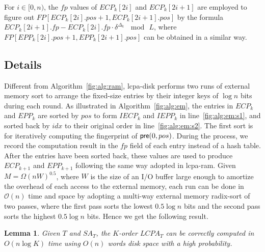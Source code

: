 \documentclass[10pt,journal,compsoc]{IEEEtran}
\newtheorem{Lemma}{Lemma}
\begin{document}
\begin{CJK*}{GBK}{song}
For $i\in [0,n)$, the $fp$ values of $ECP_k[2i]$ and $ECP_k[2i+1]$ are employed to figure out $FP[ECP_k[2i].pos+1, ECP_k[2i+1].pos]$ by the formula $ECP_k[2i+1].fp - ECP_k[2i].fp \cdot \delta^{\Delta_k} \, \mod \, L$, where $FP[EPP_k[2i].pos+1, EPP_k[2i+1].pos]$ can be obtained in a similar way.

\subsection{Details}
Different from Algorithm~\ref{fig:alg:ram}, lcpa-disk performs two runs of external memory sort to arrange the fixed-size entries by their integer keys of $\log n$ bits during each round. As illustrated in Algorithm~\ref{fig:alg:em}, the entries in $ECP_k$ and $EPP_k$ are sorted by $pos$ to form $IECP_k$ and $IEPP_k$ in line~\ref{fig:alg:em:s1}, and sorted back by $idx$ to their original order in line~\ref{fig:alg:em:s2}. The first sort is for iteratively computing the fingerprint of ${\sf pre}(0,pos)$. During the process, we record the computation result in the $fp$ field of each entry instead of a hash table. After the entries have been sorted back, these values are used to produce $ECP_{k+1}$ and $EPP_{k+1}$ following the same way adopted in lcpa-ram. Given $M=\Omega(nW)^{0.5}$, where $W$ is the size of an I/O buffer large enough to amortize the overhead of each access to the external memory, each run can be done in $\mathcal{O}(n)$ time and space by adopting a multi-way external memory radix-sort of two passes, where the first pass sorts the lowest $0.5\log n$ bits and the second pass sorts the highest $0.5\log n$ bits. Hence we get the following result.

\begin{Lemma}
\label{thm:lcp:em}
Given $T$ and $SA_T$, the $K$-order $LCPA_T$ can be correctly computed in $O(n \log K)$ time using $O(n)$ words disk space with a high probability.
\end{Lemma}


\end{CJK*}
\end{document}
